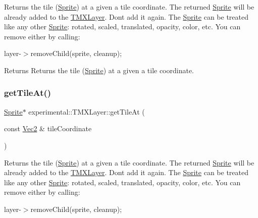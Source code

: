 Returns the tile (\hyperlink{classSprite}{Sprite}) at a given a tile coordinate. The returned \hyperlink{classSprite}{Sprite} will be already added to the \hyperlink{classexperimental_1_1TMXLayer}{T\+M\+X\+Layer}. Don\textquotesingle{}t add it again. The \hyperlink{classSprite}{Sprite} can be treated like any other \hyperlink{classSprite}{Sprite}\+: rotated, scaled, translated, opacity, color, etc. You can remove either by calling\+:
\begin{DoxyItemize}
\item layer-\/$>$remove\+Child(sprite, cleanup);
\end{DoxyItemize}

\begin{DoxyReturn}{Returns}
Returns the tile (\hyperlink{classSprite}{Sprite}) at a given a tile coordinate. 
\end{DoxyReturn}
\mbox{\label{classexperimental_1_1TMXLayer_a7fb4a490b6b26e07a34a2b379bb180b1}} 
\subsubsection{\texorpdfstring{get\+Tile\+At()}{getTileAt()}\hspace{0.1cm}{\footnotesize\ttfamily [2/2]}}
{\footnotesize\ttfamily \hyperlink{classSprite}{Sprite}$\ast$ experimental\+::\+T\+M\+X\+Layer\+::get\+Tile\+At (\begin{DoxyParamCaption}\item[{const \hyperlink{classVec2}{Vec2} \&}]{tile\+Coordinate }\end{DoxyParamCaption})}

Returns the tile (\hyperlink{classSprite}{Sprite}) at a given a tile coordinate. The returned \hyperlink{classSprite}{Sprite} will be already added to the \hyperlink{classexperimental_1_1TMXLayer}{T\+M\+X\+Layer}. Don\textquotesingle{}t add it again. The \hyperlink{classSprite}{Sprite} can be treated like any other \hyperlink{classSprite}{Sprite}\+: rotated, scaled, translated, opacity, color, etc. You can remove either by calling\+:
\begin{DoxyItemize}
\item layer-\/$>$remove\+Child(sprite, cleanup);
\end{DoxyItemize}

